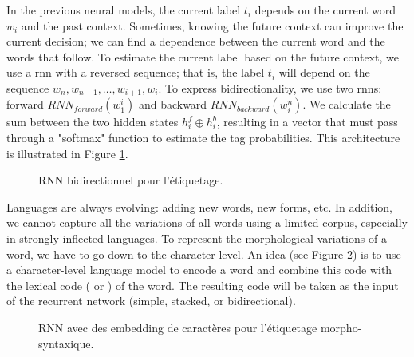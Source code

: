 \documentclass{KBook}
\begin{document}
In the previous neural models, the current label $t_i$ depends on the current word $w_i$ and the past context. Sometimes, knowing the future context can improve the current decision; we can find a dependence between the current word and the words that follow. To estimate the current label based on the future context, we use a \ac{rnn} with a reversed sequence; that is, the label $t_i$ will depend on the sequence $w_n, w_{n-1}, \ldots, w_{i+1}, w_{i}$. To express bidirectionality, we use two \ac{rnn}s: forward $RNN_{forward}(w_1^i)$ and backward $RNN_{backward}(w_i^n)$. We calculate the sum between the two hidden states $h_i^f \oplus h_i^b$, resulting in a vector that must pass through a "softmax" function to estimate the tag probabilities. This architecture is illustrated in Figure \ref{fig:pos-rnn3}.
\begin{figure}[ht]
	\centering
	\caption[RNN bidirectionnel pour l'étiquetage morpho-syntaxique.]{RNN bidirectionnel pour l'étiquetage.}
	\label{fig:pos-rnn3}
\end{figure}

Languages are always evolving: adding new words, new forms, etc. In addition, we cannot capture all the variations of all words using a limited corpus, especially in strongly inflected languages. To represent the morphological variations of a word, we have to go down to the character level. An idea (see Figure \ref{fig:pos-rnn4}) is to use a character-level language model to encode a word and combine this code with the lexical code ( or ) of the word. The resulting code will be taken as the input of the recurrent network (simple, stacked, or bidirectional).
\begin{figure}[ht]
	\centering
	\caption[Embedding de caractères pour l'étiquetage morpho-syntaxique.]{RNN avec des embedding de caractères pour l'étiquetage morpho-syntaxique.}
	\label{fig:pos-rnn4}
\end{figure}
\end{document}
